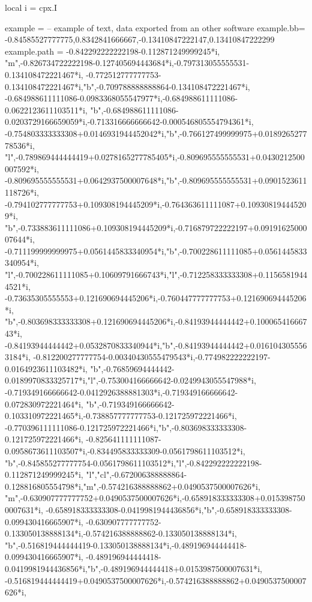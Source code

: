 \documentclass[border=5pt]{standalone}%
\begin{document}
\begin{luacode*}
local i = cpx.I

example = {} -- example of text, data exported from an other software
example.bb= {-0.84585527777775,0.8342841666667,-0.13410847222147,0.13410847222299}
example.path = {-0.842292222222198-0.112871249999245*i,
"m",-0.826734722222198-0.127405694443684*i,-0.797313055555531-0.134108472221467*i,
-0.772512777777753-0.134108472221467*i,"b",-0.709788888888864-0.134108472221467*i,
-0.684988611111086-0.0983368055547977*i,-0.684988611111086-0.0622123611103511*i,
"b",-0.684988611111086-0.0203729166659059*i,-0.713316666666642-0.000546805554794361*i,
-0.754803333333308+0.0146931944452042*i,"b",-0.766127499999975+0.018926527778536*i,
"l",-0.789869444444419+0.0278165277785405*i,-0.809695555555531+0.0430212500007592*i,
-0.809695555555531+0.0642937500007648*i,"b",-0.809695555555531+0.0901523611118726*i,
-0.794102777777753+0.109308194445209*i,-0.764363611111087+0.109308194445209*i,
"b",-0.733883611111086+0.109308194445209*i,-0.716879722222197+0.0919162500007644*i,
-0.711199999999975+0.0561445833340954*i,"b",-0.700228611111085+0.0561445833340954*i,
"l",-0.700228611111085+0.10609791666743*i,"l",-0.712258333333308+0.11565819444521*i,
-0.73635305555553+0.121690694445206*i,-0.760447777777753+0.121690694445206*i,
"b",-0.803698333333308+0.121690694445206*i,-0.84193944444442+0.10006541666743*i,
-0.84193944444442+0.0532870833340944*i,"b",-0.84193944444442+0.0161043055563184*i,
-0.812200277777754-0.00340430555479543*i,-0.774982222222197-0.0164923611103482*i,
"b",-0.76859694444442-0.0189970833325717*i,"l",-0.753004166666642-0.0249943055547988*i,
-0.719349166666642-0.0412926388881303*i,-0.719349166666642-0.072830972221464*i,
"b",-0.719349166666642-0.103310972221465*i,-0.738857777777753-0.121725972221466*i,
-0.770396111111086-0.121725972221466*i,"b",-0.803698333333308-0.121725972221466*i,
-0.825641111111087-0.0958673611103507*i,-0.834495833333309-0.0561798611103512*i,
"b",-0.845855277777754-0.0561798611103512*i,"l",-0.842292222222198-0.112871249999245*i,
"l","cl",-0.672006388888864-0.128816805554798*i,"m",-0.574216388888862+0.0490537500007626*i,
"m",-0.630907777777752+0.0490537500007626*i,-0.658918333333308+0.0153987500007631*i,
-0.658918333333308-0.0419981944436856*i,"b",-0.658918333333308-0.099430416665907*i,
-0.630907777777752-0.133050138888134*i,-0.574216388888862-0.133050138888134*i,
"b",-0.516819444444419-0.133050138888134*i,-0.489196944444418-0.099430416665907*i,
-0.489196944444418-0.0419981944436856*i,"b",-0.489196944444418+0.0153987500007631*i,
-0.516819444444419+0.0490537500007626*i,-0.574216388888862+0.0490537500007626*i,
}
\end{luacode*}
\end{document}
